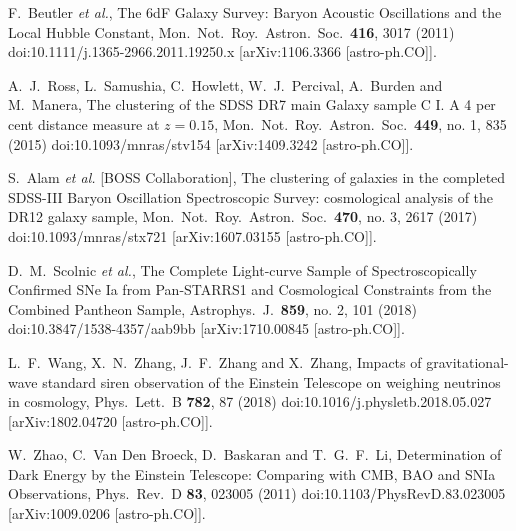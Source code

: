\documentclass[aps,prd,nofootinbib,amsmath,amssymb,superscriptaddress,twocolumn,10pt]{revtex4}%
\begin{document}
\begin{thebibliography}{99}
  F.~Beutler {\it et al.},
  The 6dF Galaxy Survey: Baryon Acoustic Oscillations and the Local Hubble Constant,
  Mon.\ Not.\ Roy.\ Astron.\ Soc.\  {\bf 416}, 3017 (2011)
  doi:10.1111/j.1365-2966.2011.19250.x
  [arXiv:1106.3366 [astro-ph.CO]].

  A.~J.~Ross, L.~Samushia, C.~Howlett, W.~J.~Percival, A.~Burden and M.~Manera,
  The clustering of the SDSS DR7 main Galaxy sample C I. A 4 per cent distance measure at $z = 0.15$,
  Mon.\ Not.\ Roy.\ Astron.\ Soc.\  {\bf 449}, no. 1, 835 (2015)
  doi:10.1093/mnras/stv154
  [arXiv:1409.3242 [astro-ph.CO]].

  S.~Alam {\it et al.} [BOSS Collaboration],
  The clustering of galaxies in the completed SDSS-III Baryon Oscillation Spectroscopic Survey: cosmological analysis of the DR12 galaxy sample,
  Mon.\ Not.\ Roy.\ Astron.\ Soc.\  {\bf 470}, no. 3, 2617 (2017)
  doi:10.1093/mnras/stx721
  [arXiv:1607.03155 [astro-ph.CO]].

  D.~M.~Scolnic {\it et al.},
  The Complete Light-curve Sample of Spectroscopically Confirmed SNe Ia from Pan-STARRS1 and Cosmological Constraints from the Combined Pantheon Sample,
  Astrophys.\ J.\  {\bf 859}, no. 2, 101 (2018)
  doi:10.3847/1538-4357/aab9bb
  [arXiv:1710.00845 [astro-ph.CO]].

  L.~F.~Wang, X.~N.~Zhang, J.~F.~Zhang and X.~Zhang,
  Impacts of gravitational-wave standard siren observation of the Einstein Telescope on weighing neutrinos in cosmology,
  Phys.\ Lett.\ B {\bf 782}, 87 (2018)
  doi:10.1016/j.physletb.2018.05.027
  [arXiv:1802.04720 [astro-ph.CO]].

  W.~Zhao, C.~Van Den Broeck, D.~Baskaran and T.~G.~F.~Li,
  Determination of Dark Energy by the Einstein Telescope: Comparing with CMB, BAO and SNIa Observations,
  Phys.\ Rev.\ D {\bf 83}, 023005 (2011)
  doi:10.1103/PhysRevD.83.023005
  [arXiv:1009.0206 [astro-ph.CO]].


\end{thebibliography}
\end{document}
